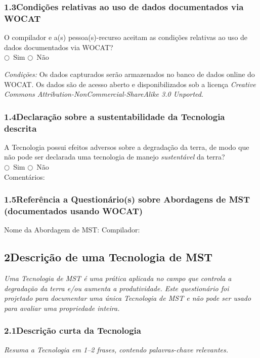 \subsubsection*{1.3\quad Condições relativas ao uso de dados documentados via WOCAT}

O compilador e a(s) pessoa(s)-recurso aceitam as condições relativas ao uso de dados documentados via WOCAT?\\
$\bigcirc$~Sim \qquad $\bigcirc$~Não

\medskip\noindent\textit{Condições:} Os dados capturados serão armazenados no banco de dados online do WOCAT. Os dados são de acesso aberto e disponibilizados sob a licença \textit{Creative Commons Attribution-NonCommercial-ShareAlike 3.0 Unported}.

\subsubsection*{1.4\quad Declaração sobre a sustentabilidade da Tecnologia descrita}

A Tecnologia possui efeitos adversos sobre a degradação da terra, de modo que não pode ser declarada uma tecnologia de manejo \textit{sustentável} da terra?\\
$\bigcirc$~Sim \qquad $\bigcirc$~Não\\
Comentários: \dotfill

\subsubsection*{1.5\quad Referência a Questionário(s) sobre Abordagens de MST (documentados usando WOCAT)}

Nome da Abordagem de MST: \dotfill\quad Compilador: \dotfill

\subsection*{2\quad Descrição de uma Tecnologia de MST}

\textit{Uma Tecnologia de MST é uma prática aplicada no campo que controla a degradação da terra e/ou aumenta a produtividade. Este questionário foi projetado para documentar uma única Tecnologia de MST e não pode ser usado para avaliar uma propriedade inteira.}

\subsubsection*{2.1\quad Descrição curta da Tecnologia}
\textit{Resuma a Tecnologia em 1--2 frases, contendo palavras-chave relevantes.}\\[4pt]
\dotfill\\[2pt]\dotfill

